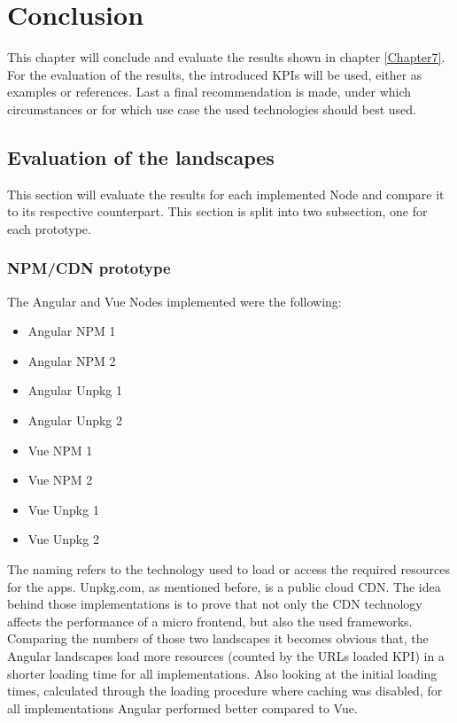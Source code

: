 \chapter{Conclusion} %
\label{Chapter8}


This chapter will conclude and evaluate the results shown in chapter \ref{Chapter7}. For the evaluation of the results, the introduced KPIs will be used, either as examples or references.
Last a final recommendation is made, under which circumstances or for which use case the used technologies should best used.
 
\section{Evaluation of the landscapes}

This section will evaluate the results for each implemented Node and compare it to its respective counterpart. This section is split into two subsection, one for each prototype.

\subsection{NPM/CDN prototype}

The Angular and Vue Nodes implemented were the following:

\begin{itemize}[noitemsep]
	\item Angular NPM 1
	\item Angular NPM 2
	\item Angular Unpkg 1
	\item Angular Unpkg 2
	\item Vue NPM 1
	\item Vue NPM 2
	\item Vue Unpkg 1
	\item Vue Unpkg 2
\end{itemize}

The naming refers to the technology used to load or access the required resources for the apps. Unpkg.com, as mentioned before, is a public cloud CDN. The idea behind those implementations is to prove that not only the CDN technology affects the performance of a micro frontend, but also the used frameworks.
Comparing the numbers of those two landscapes it becomes obvious that, the Angular landscapes load more resources (counted by the URLs loaded KPI) in a shorter loading time for all implementations. 
Also looking at the initial loading times, calculated through the loading procedure where caching was disabled, for all implementations Angular performed better compared to Vue.


